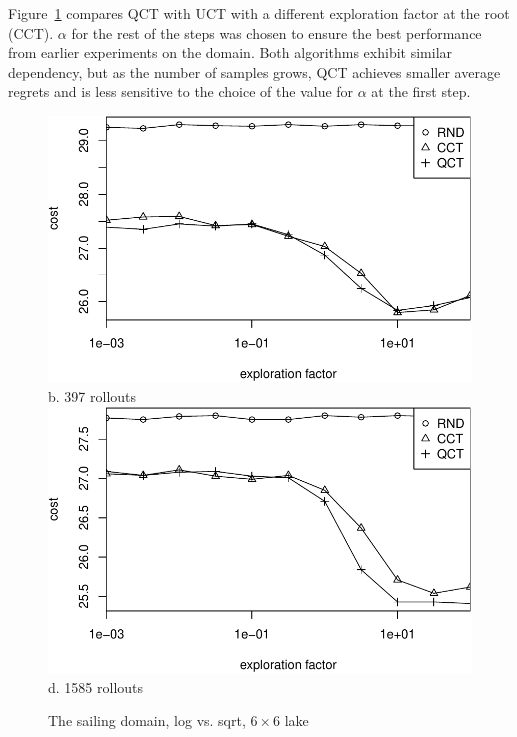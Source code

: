 \documentclass[letterpaper]{article}
\begin{document}
Figure~\ref{fig:sailing-rcq-vs-factor} compares QCT with UCT with a
different exploration factor at the root (CCT). $\alpha$ for the rest of
the steps was chosen to ensure the best performance from earlier
experiments on the domain. Both algorithms exhibit similar dependency,
but as the number of samples grows, QCT achieves smaller average
regrets and is less sensitive to the choice of the value for $\alpha$ at
the first step.
\begin{figure}[t]
  \centering
  \includegraphics[scale=0.45]{rcq-size=6-nsamples=397.pdf}\\
  b. 397 rollouts\\
  \vspace{1em}
  \includegraphics[scale=0.45]{rcq-size=6-nsamples=1585.pdf}\\
  d. 1585 rollouts\\
  \caption{The sailing domain, log vs. sqrt, $6\times 6$ lake}
  \label{fig:sailing-rcq-vs-factor}
\end{figure}
\end{document}
